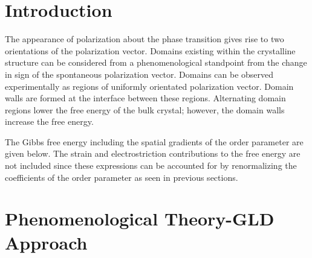 \documentclass{article}
\begin{document}
\linespread{1.0}
\justify
\section{Introduction}
\justify

\indent           The appearance of polarization about the phase transition gives rise to two orientations of the polarization vector.  Domains existing within the crystalline structure can be considered from a phenomenological standpoint from the change in sign of the spontaneous polarization vector.  Domains can be observed experimentally as regions of uniformly orientated polarization vector.  Domain walls are formed at the interface between these regions.  Alternating domain regions lower the free energy of the bulk crystal; however, the domain walls increase the free energy.

The Gibbs free energy including the spatial gradients of the order parameter are given below.  The strain and electrostriction contributions to the free energy are not included since these expressions can be accounted for by renormalizing the coefficients of the order parameter as seen in previous sections.

\section{Phenomenological Theory-GLD Approach}

\end{document}
